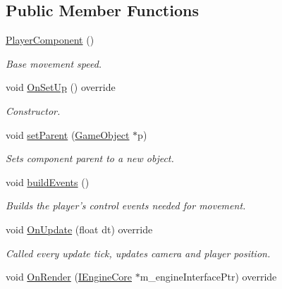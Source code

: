 \subsection*{Public Member Functions}
\begin{DoxyCompactItemize}
\item 
\hypertarget{class_player_component_adf9bdf600a6cc7d34aa848163c4a9be7}{\hyperlink{class_player_component_adf9bdf600a6cc7d34aa848163c4a9be7}{Player\+Component} ()}\label{class_player_component_adf9bdf600a6cc7d34aa848163c4a9be7}

\begin{DoxyCompactList}\small\item\em Base movement speed. \end{DoxyCompactList}\item 
void \hyperlink{class_player_component_a949792196197b92dfc1631fb66234868}{On\+Set\+Up} () override
\begin{DoxyCompactList}\small\item\em Constructor. \end{DoxyCompactList}\item 
\hypertarget{class_player_component_a5a153f0d90650d6b9bf07fa2fac44ec3}{void \hyperlink{class_player_component_a5a153f0d90650d6b9bf07fa2fac44ec3}{set\+Parent} (\hyperlink{class_game_object}{Game\+Object} $\ast$p)}\label{class_player_component_a5a153f0d90650d6b9bf07fa2fac44ec3}

\begin{DoxyCompactList}\small\item\em Sets component parent to a new object. \end{DoxyCompactList}\item 
\hypertarget{class_player_component_a057ce51dc6ef125a4e90ec8c92b2147b}{void \hyperlink{class_player_component_a057ce51dc6ef125a4e90ec8c92b2147b}{build\+Events} ()}\label{class_player_component_a057ce51dc6ef125a4e90ec8c92b2147b}

\begin{DoxyCompactList}\small\item\em Builds the player's control events needed for movement. \end{DoxyCompactList}\item 
\hypertarget{class_player_component_a2e999887dae2451eebb7c173415d98be}{void \hyperlink{class_player_component_a2e999887dae2451eebb7c173415d98be}{On\+Update} (float dt) override}\label{class_player_component_a2e999887dae2451eebb7c173415d98be}

\begin{DoxyCompactList}\small\item\em Called every update tick, updates camera and player position. \end{DoxyCompactList}\item 
\hypertarget{class_player_component_a09993dd0dc2edea3fccc08ec7d6a1d56}{void \hyperlink{class_player_component_a09993dd0dc2edea3fccc08ec7d6a1d56}{On\+Render} (\hyperlink{class_i_engine_core}{I\+Engine\+Core} $\ast$m\+\_\+engine\+Interface\+Ptr) override}\label{class_player_component_a09993dd0dc2edea3fccc08ec7d6a1d56}


\end{DoxyCompactItemize}
